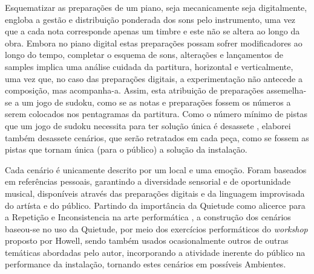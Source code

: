 \documentclass[../main.tex]{subfiles}
\begin{document}

Esquematizar as preparações de um piano, seja mecanicamente seja digitalmente, engloba a gestão e distribuição ponderada dos sons pelo instrumento, uma vez que a cada nota corresponde apenas um timbre e este não se altera ao longo da obra.
Embora no piano digital estas preparações possam sofrer modificadores ao longo do tempo, completar o esquema de sons, alterações e lançamentos de samples implica uma análise cuidada da partitura, horizontal e verticalmente, uma vez que, no caso das preparações digitais, a experimentação não antecede a composição, mas acompanha-a. Assim, esta atribuição de preparações assemelha-se a um jogo de sudoku, como se as notas e preparações fossem os números a serem colocados nos pentagramas da partitura.
Como o número mínimo de pistas que um jogo de sudoku necessita para ter solução única é desassete \cite{mcguire2012}, elaborei também desassete cenários, que serão retratados em cada peça, como se fossem as pistas que tornam única (para o público) a solução da instalação.

Cada cenário é unicamente descrito por um local e uma emoção. Foram baseados em referências pessoais, garantindo a diversidade sensorial e de oportunidade musical, disponíveis através das preparações digitais e da linguagem improvisada do artísta e do público. Partindo da importância da Quietude como alicerce para a Repetição e Inconsistencia na arte performática \cite{howell1999}, a construção dos cenários baseou-se no uso da Quietude, por meio dos exercícios performáticos do \textit{workshop} proposto por Howell, sendo também usados ocasionalmente outros de outras temáticas abordadas pelo autor, incorporando a atividade inerente do público na performance da instalação, tornando estes cenários em possíveis Ambientes.
\end{document}
